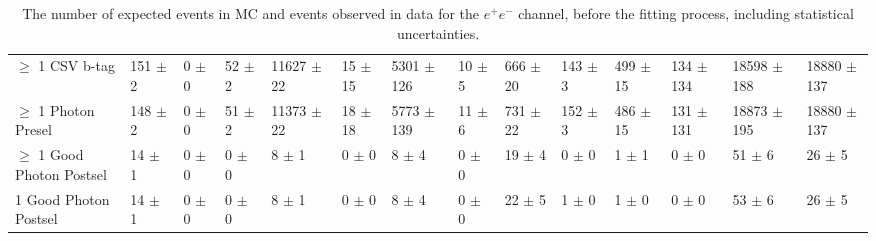 \begin{table}
{\begin{tabular}{|l|l|l|l|l|l|l|l|l|l|l|l|l|l|}
$\geq$ 1 CSV b-tag & 151 $\pm$ 2 \ & 0 $\pm$ 0 \ & 52 $\pm$ 2 \ & 11627 $\pm$ 22 \ & 15 $\pm$ 15 \ & 5301 $\pm$ 126 \ & 10 $\pm$ 5 \ & 666 $\pm$ 20 \ & 143 $\pm$ 3 \ & 499 $\pm$ 15 \ & 134 $\pm$ 134\ & 18598 $\pm$ 188 \ & 18880 $\pm$ 137 \\
$\geq$ 1 Photon Presel & 148 $\pm$ 2 \ & 0 $\pm$ 0 \ & 51 $\pm$ 2 \ & 11373 $\pm$ 22 \ & 18 $\pm$ 18 \ & 5773 $\pm$ 139 \ & 11 $\pm$ 6 \ & 731 $\pm$ 22 \ & 152 $\pm$ 3 \ & 486 $\pm$ 15 \ & 131 $\pm$ 131\ & 18873 $\pm$ 195 \ & 18880 $\pm$ 137 \\
$\geq$ 1 Good Photon Postsel & 14 $\pm$ 1 \ & 0 $\pm$ 0 \ & 0 $\pm$ 0 \ & 8 $\pm$ 1 \ & 0 $\pm$ 0 \ & 8 $\pm$ 4 \ & 0 $\pm$ 0 \ & 19 $\pm$ 4 \ & 0 $\pm$ 0 \ & 1 $\pm$ 1 \ & 0 $\pm$ 0\ & 51 $\pm$ 6 \ & 26 $\pm$ 5 \\
1 Good Photon Postsel & 14 $\pm$ 1 \ & 0 $\pm$ 0 \ & 0 $\pm$ 0 \ & 8 $\pm$ 1 \ & 0 $\pm$ 0 \ & 8 $\pm$ 4 \ & 0 $\pm$ 0 \ & 22 $\pm$ 5 \ & 1 $\pm$ 0 \ & 1 $\pm$ 0 \ & 0 $\pm$ 0\ & 53 $\pm$ 6 \ & 26 $\pm$ 5 \\


\hline
\end{tabular}
}
\caption{The number of expected events in MC and events observed in data for the $e^+e^-$ channel, before the fitting process, including statistical uncertainties.}
\end{table}

